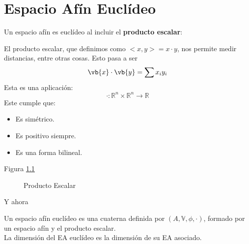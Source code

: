\documentclass{./Geometria.tex}
\begin{document}
\chapter{Espacio Afín Euclídeo}
Un espacio afín es euclídeo al incluir el \textbf{producto escalar}:
\begin{defin}
El producto escalar, que definimos como $<x,y> = x\cdot y$, nos permite medir distancias, entre otras cosas. Esto pasa a ser
\[
	\vb{x}\cdot \vb{y} = \sum x_{i}y_{i}
\]
Esta es una aplicación:
\[
	\cdot : \mathbb{R}^{n}\times \mathbb{R}^{n} \to \mathbb{R}
\]
Este cumple que:
\begin{itemize}
	\item Es simétrico.
	\item Es positivo siempre.
	\item Es una forma bilineal.
\end{itemize}
Figura \ref{fig:p-escalar}
\end{defin}
\begin{figure}[ht]
    \centering
    \caption{Producto Escalar}
    \label{fig:p-escalar}
\end{figure}
Y ahora
\begin{defin}
Un espacio afín euclídeo es una cuaterna definida por $(A, \mathbb{V}, \phi, \cdot )$, formado por un espacio afín y el producto escalar.\\
La dimensión del EA euclídeo es la dimensión de su EA asociado.
\end{defin}
\end{document}
